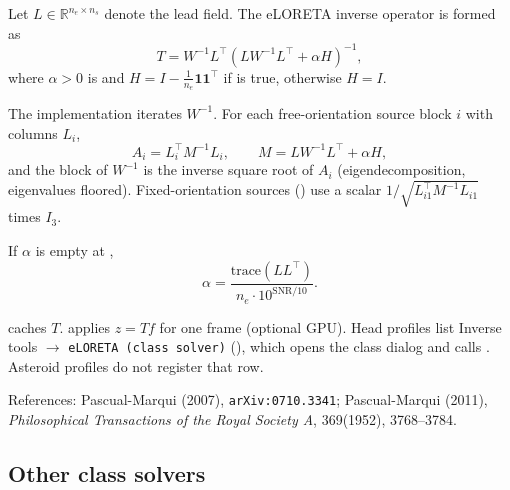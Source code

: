 Let \(L \in \mathbb{R}^{n_e \times n_s}\) denote the lead field. The
eLORETA inverse operator is formed as
\begin{equation}
T = W^{-1} L^\top (L W^{-1} L^\top + \alpha H)^{-1},
\end{equation}
where \(\alpha > 0\) is  and
\(H = I - \frac{1}{n_e}\mathbf{1}\mathbf{1}^\top\) if
 is true, otherwise \(H = I\).

The implementation iterates \(W^{-1}\). For each free-orientation source
block \(i\) with columns \(L_i\),
\begin{equation}
A_i = L_i^\top M^{-1} L_i, \qquad
M = L W^{-1} L^\top + \alpha H,
\end{equation}
and the block of \(W^{-1}\) is the inverse square root of \(A_i\)
(eigendecomposition, eigenvalues floored). Fixed-orientation sources
() use a scalar \(1/\sqrt{L_{i1}^\top M^{-1} L_{i1}}\)
times \(I_3\).

If \(\alpha\) is empty at ,
\begin{equation}
\alpha = \frac{\mathrm{trace}(L L^\top)}{n_e \cdot 10^{\mathrm{SNR}/10}}.
\end{equation}

 caches \(T\).  applies \(z = Tf\) for one
frame (optional GPU). Head profiles list Inverse tools $\to$
\texttt{eLORETA (class solver)} (), which opens
the class dialog and calls . Asteroid profiles
do not register that row.

References: Pascual-Marqui (2007), \texttt{arXiv:0710.3341}; Pascual-Marqui
(2011), \emph{Philosophical Transactions of the Royal Society A}, 369(1952),
3768--3784.

\subsection{Other class solvers}

